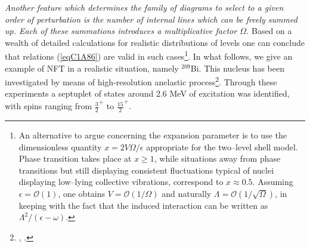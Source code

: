 \textit{Another feature which determines the family of diagrams to select to a given order of perturbation is the number of internal lines which can be freely summed up. Each of these summations introduces a multiplicative factor $\Omega$.} Based on a wealth of detailed calculations for realistic distributions of levels one can conclude that  relations (\ref{eqC1A86}) are valid in such cases\footnote{An alternative to argue concerning the expansion parameter is to use the dimensionless quantity $x=2V\Omega/\epsilon$ appropriate for the two--level shell model. Phase transition takes place at $x\geq1$, while situations away from phase transitions but still displaying consistent fluctuations typical of nuclei displaying low--lying collective vibrations, correspond to $x\approx0.5$. Assuming $\epsilon=\mathcal O(1)$, one obtains $V=\mathcal O(1/\Omega)$ and naturally $\Lambda=\mathcal O(1/\sqrt{\Omega})$, in keeping with the fact that the induced interaction can be written as $\Lambda^2/(\epsilon-\omega)$.}.  In what follows, we give an example of NFT in a realistic situation, namely $^{209}$Bi. 
This nucleus has been investigated by means of high-resolution anelastic process\footnote{\cite{Ungrin:71}, \cite{Broglia:70}.}. Through these experiments a septuplet of states around 2.6 MeV of excitation was identified, with spins 
ranging from $\frac{3}{2}^+$ to $\frac{15}{2}^+$. 


